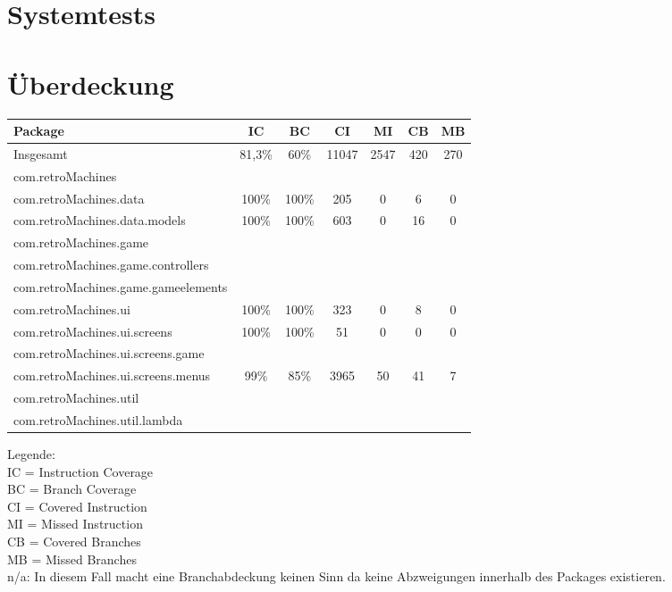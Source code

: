 \documentclass[parskip=full]{scrreprt}
\begin{document}
\chapter{Systemtests}

\chapter{Überdeckung}

\begin{tabular} { | l | c | c | c | c | c | c | }
	\hline
	\textbf{Package} & \textbf{IC} & \textbf{BC} & \textbf{CI} & \textbf{MI} & \textbf{CB} & \textbf{MB} \\
	\hline
	Insgesamt & 81,3\% & 60\% & 11047 & 2547 & 420 & 270 \\
	\hline
	com.retroMachines \\
	\hline
	com.retroMachines.data & 100\% & 100\% & 205 & 0 & 6 & 0  \\
	\hline
	com.retroMachines.data.models & 100\% & 100\% & 603 & 0 & 16 & 0 \\
	\hline
	com.retroMachines.game \\
	\hline
	com.retroMachines.game.controllers \\
	\hline
	com.retroMachines.game.gameelements \\
	\hline
	com.retroMachines.ui & 100\% & 100\% & 323 & 0 & 8 & 0 \\
	\hline
	com.retroMachines.ui.screens & 100\% & 100\% & 51 & 0 & 0 & 0 \\
	\hline
	com.retroMachines.ui.screens.game \\
	\hline
	com.retroMachines.ui.screens.menus & 99\% & 85\% & 3965 & 50 & 41 & 7 \\
	\hline
	com.retroMachines.util \\
	\hline
	com.retroMachines.util.lambda \\
	\hline
\end{tabular}

Legende: \\
	IC = Instruction Coverage \\
	BC = Branch Coverage \\
	CI = Covered Instruction \\
	MI = Missed Instruction \\
	CB = Covered Branches \\
	MB = Missed Branches \\
	n/a: In diesem Fall macht eine Branchabdeckung keinen Sinn da keine Abzweigungen innerhalb des Packages existieren. \\
\end{document}
